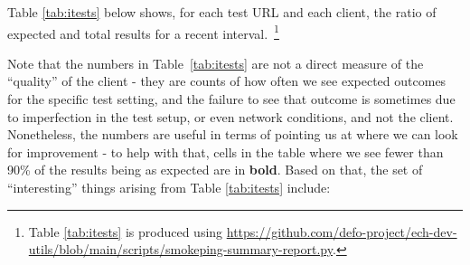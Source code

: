 Table \ref{tab:itests} below shows, for each test URL and each client,
the ratio of expected and total results for a recent 
interval.~\footnote{Table \ref{tab:itests} is produced
using \url{https://github.com/defo-project/ech-dev-utils/blob/main/scripts/smokeping-summary-report.py}.}


\begin{center}

\end{center}

Note that the numbers in Table~\ref{tab:itests} are not a direct measure of the
``quality'' of the client - they are counts of how often we see expected
outcomes for the specific test setting, and the failure to see that outcome is
sometimes due to imperfection in the test setup, or even network conditions,
and not the client.  Nonetheless, the numbers are useful in terms of pointing
us at where we can look for improvement - to help with that, cells in the table
where we see fewer than 90\% of the results being as expected are in
\textbf{bold}.  Based on that, the set of ``interesting'' things arising from
Table \ref{tab:itests} include:

